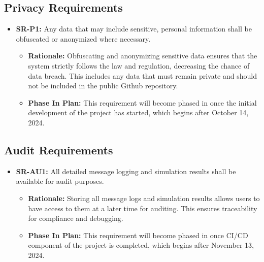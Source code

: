 \documentclass[12pt]{article}
\begin{document}
\subsection{Privacy Requirements}
\begin{itemize}
  \item \label{SR-P1} \textbf{SR-P1:} Any data that may include sensitive, personal information shall be obfuscated or anonymized where necessary.
  \begin{itemize}
    \item \textbf{Rationale:} Obfuscating and anonymizing sensitive data ensures that the system strictly follows the law and regulation, decreasing the chance of data breach. This includes any data that must remain private and should not be included in the public Github repository.
    \item \textbf{Phase In Plan:}  This requirement will become phased in once the initial development of the project has started, which begins after October 14, 2024. 
  \end{itemize}
\end{itemize}

\subsection{Audit Requirements}
\begin{itemize}
  \item \label{SR-AU1} \textbf{SR-AU1:} All detailed message logging and simulation results shall be available for audit purposes.
  \begin{itemize}
    \item \textbf{Rationale:} Storing all message logs and simulation results allows users to have access to them at a later time for auditing. This ensures traceability for compliance and debugging.
    \item \textbf{Phase In Plan:} This requirement will become phased in once CI/CD component of the project is completed, which begins after November 13, 2024. 

  \end{itemize}
\end{itemize}
\end{document}
